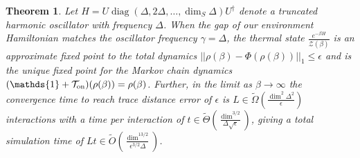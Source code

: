 \documentclass{article}
\newtheorem{theorem}{Theorem}
\newcommand{\on}{\rm on}
\newcommand{\norm}[1]{\left| \left| #1 \right| \right|}
\newcommand{\bigotilde}[1]{\widetilde{O} \left( #1 \right)}
\newcommand{\partfun}{\mathcal{Z}}
\newcommand{\identity}{\mathds{1}}
\DeclareMathOperator{\diag}{diag}
\begin{document}
\begin{theorem}\label{thm:harmonic_oscillator}
    Let $H = U \diag(\Delta , 2 \Delta , \ldots, \dim_S \Delta) U^\dagger$ denote a truncated harmonic oscillator with frequency $\Delta$. When the gap of our environment Hamiltonian matches the oscillator frequency $\gamma = \Delta$, the thermal state $\frac{e^{-\beta H}}{\partfun(\beta)}$ is an approximate fixed point to the total dynamics $\norm{\rho(\beta) - \Phi(\rho(\beta))}_1 \le \epsilon$ and is the unique fixed point for the Markov chain dynamics $(\identity + \mathcal{T}_{\on})(\rho(\beta)) = \rho(\beta)$. Further, in the limit as $\beta \to \infty$ the convergence time to reach trace distance error of $\epsilon$ is $L \in \widetilde{\Omega}\left(\frac{\dim^2 \Delta^2 }{\epsilon} \right)$ interactions with a time per interaction of $t \in \widetilde{\Theta}\left( \frac{\dim^{3/2}}{\Delta \sqrt{\epsilon}}\right)$, giving a total simulation time of $L t \in \bigotilde{\frac{\dim^{13/2}}{\epsilon^{3/2} \Delta}}$.
\end{theorem}
\end{document}
